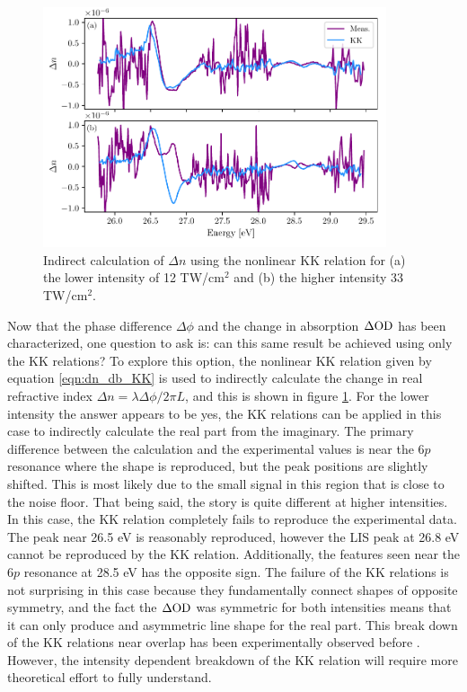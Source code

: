 \begin{figure}
	\centering
	\includegraphics[width=0.9\textwidth]{figures/CATS/dn_kk_lineout.pdf}
	\caption[Nonlinear KK relation applied to CATS measurement]{Indirect calculation of $\Delta n$ using the nonlinear KK relation for (a) the lower intensity of 12 TW/cm$^2$ and (b) the higher intensity 33 TW/cm$^2$.}
	\label{fig:dn_kk_lineout}
\end{figure}

Now that the phase difference $\Delta\phi$ and the change in absorption $\Delta\mathrm{OD}$ has been characterized, one question to ask is: can this same result be achieved using only the KK relations? To explore this option, the nonlinear KK relation given by equation \ref{eqn:dn_db_KK} is used to indirectly calculate the change in real refractive index $\Delta n = \lambda \Delta\phi/2\pi L$, and this is shown in figure \ref{fig:dn_kk_lineout}.  For the lower intensity the answer appears to be yes, the KK relations can be applied in this case to indirectly calculate the real part from the imaginary.  The primary difference between the calculation and the experimental values is near the $6p$ resonance where the shape is reproduced, but the peak positions are slightly shifted.  This is most likely due to the small signal in this region that is close to the noise floor.  That being said, the story is quite different at higher intensities.  In this case, the KK relation completely fails to reproduce the experimental data.  The peak near 26.5 eV is reasonably reproduced, however the LIS peak at 26.8 eV cannot be reproduced by the KK relation.  Additionally, the features seen near the $6p$ resonance at 28.5 eV has the opposite sign.  The failure of the KK relations is not surprising in this case because they fundamentally connect shapes of opposite symmetry, and the fact the $\Delta\mathrm{OD}$ was symmetric for both intensities means that it can only produce and asymmetric line shape for the real part.  This break down of the KK relations near overlap has been experimentally observed before \cite{tokunagaFemtosecondTimeresolvedDispersion1993}.  However, the intensity dependent breakdown of the KK relation will require more theoretical effort to fully understand.

